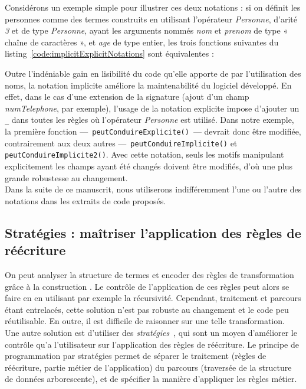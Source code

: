Considérons un exemple simple pour illustrer ces deux notations : si on définit
les personnes comme des termes construits en utilisant l'opérateur
\emph{Personne}, d'arité \emph{3} et de type \emph{Personne}, ayant les
arguments nommés \emph{nom} et \emph{prenom} de type « chaîne de caractères »,
et \emph{age} de type entier, les trois fonctions suivantes du
listing~\ref{code:implicitExplicitNotations} sont équivalentes :



Outre l'indéniable gain en lisibilité du code qu'elle apporte de par
l'utilisation des noms, la notation implicite améliore la maintenabilité du
logiciel développé. En effet, dans le cas d'une extension de la signature
(ajout d'un champ \emph{numTelephone}, par exemple), l'usage de la notation
explicite impose d'ajouter un \texttt{\_} dans toutes les règles où l'opérateur
\emph{Personne} est utilisé. Dans notre exemple, la première fonction
---~\texttt{peutConduireExplicite()}~--- devrait donc être modifiée,
contrairement aux deux autres ---~\texttt{peutConduireImplicite()} et
\texttt{peutConduireImplicite2()}. Avec cette
notation, seuls les motifs manipulant explicitement les champs ayant été
changés doivent être modifiés, d'où une plus grande robustesse au changement.\\
Dans la suite de ce manuscrit, nous utiliserons indifféremment l'une ou l'autre
des notations dans les extraits de code proposés.


\subsection{Stratégies : maîtriser l'application des règles de réécriture}
\label{subsec:strategy}

On peut analyser la structure de termes et encoder des règles de transformation
grâce à la construction . Le contrôle de l'application de ces
règles peut alors se faire en {\java} en utilisant par exemple la récursivité.
Cependant, traitement et parcours étant entrelacés, cette solution n'est pas
robuste au changement et le code peu réutilisable. En outre, il est difficile
de raisonner sur une telle transformation. Une autre solution est d'utiliser
des \emph{stratégies}~\cite{BallandMR08,Balland2012}, qui sont un moyen
d'améliorer le contrôle qu'a l'utilisateur sur l'application des règles de
réécriture. Le principe de programmation par stratégies permet de séparer le
traitement (règles de réécriture, partie métier de l'application) du parcours
(traversée de la structure de données arborescente), et de spécifier la manière
d'appliquer les règles métier.

